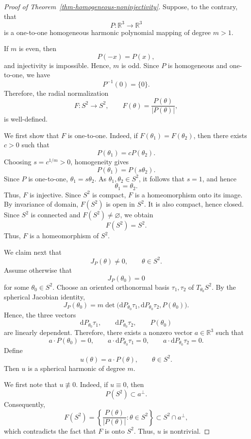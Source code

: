 \documentclass[10pt]{amsart}
\numberwithin{equation}{section}
\theoremstyle{definition}
\newcommand{\R}{\mathbb R}
\begin{document}
\begin{proof}[Proof of Theorem~\ref{thm-homogeneous-noninjectivity}]
Suppose, to the contrary, that
\[
        P:\R^3\to\R^3
\]
is a one-to-one homogeneous harmonic polynomial mapping of degree \(m>1\).

If \(m\) is even, then
\[
        P(-x)=P(x),
\]
and injectivity is impossible. Hence, \(m\) is odd. Since \(P\) is homogeneous
and one-to-one, we have
\[
        P^{-1}(0)=\{0\}.
\]
Therefore, the radial normalization
\[
        F:S^2\to S^2,
        \qquad
        F(\theta)=\frac{P(\theta)}{|P(\theta)|},
\]
is well-defined.

We first show that \(F\) is one-to-one. Indeed, if \(F(\theta_1)=F(\theta_2)\),
then there exists \(c>0\) such that
\[
        P(\theta_1)=cP(\theta_2).
\]
Choosing \(s=c^{1/m}>0\), homogeneity gives
\[
        P(\theta_1)=P(s\theta_2).
\]
Since \(P\) is one-to-one, \(\theta_1=s\theta_2\). As
\(\theta_1,\theta_2\in S^2\), it follows that \(s=1\), and hence
\[
        \theta_1=\theta_2.
\]
Thus, \(F\) is injective. Since \(S^2\) is compact, \(F\) is a homeomorphism
onto its image. By invariance of domain, \(F(S^2)\) is open in \(S^2\).
It is also compact, hence closed. Since \(S^2\) is connected and
\(F(S^2)\neq\varnothing\), we obtain
\[
        F(S^2)=S^2.
\]
Thus, \(F\) is a homeomorphism of \(S^2\).

We claim next that
\[
        J_P(\theta)\neq0,
        \qquad
        \theta\in S^2.
\]
Assume otherwise that
\[
        J_P(\theta_0)=0
\]
for some \(\theta_0\in S^2\). Choose an oriented orthonormal basis
\(\tau_1,\tau_2\) of \(T_{\theta_0}S^2\). By the spherical Jacobian identity,
\[
        J_P(\theta_0)
        =
        m\det\bigl(\mathrm{d}P_{\theta_0}\tau_1,
                   \mathrm{d}P_{\theta_0}\tau_2,
                   P(\theta_0)\bigr).
\]
Hence, the three vectors
\[
        \mathrm{d}P_{\theta_0}\tau_1,\qquad
        \mathrm{d}P_{\theta_0}\tau_2,\qquad
        P(\theta_0)
\]
are linearly dependent. Therefore, there exists a nonzero vector
\(a\in\R^3\) such that
\[
        a\cdot P(\theta_0)=0,
        \qquad
        a\cdot \mathrm{d}P_{\theta_0}\tau_1=0,
        \qquad
        a\cdot \mathrm{d}P_{\theta_0}\tau_2=0.
\]
Define
\[
        u(\theta)=a\cdot P(\theta),
        \qquad
        \theta\in S^2.
\]
Then \(u\) is a spherical harmonic of degree \(m\).

We first note that \(u\not\equiv0\). Indeed, if \(u\equiv0\), then
\[
        P(S^2)\subset a^\perp.
\]
Consequently,
\[
        F(S^2)
        =
        \left\{\frac{P(\theta)}{|P(\theta)|}:\theta\in S^2\right\}
        \subset S^2\cap a^\perp,
\]
which contradicts the fact that \(F\) is onto \(S^2\). Thus, \(u\) is
nontrivial.


\end{proof}
\end{document}
